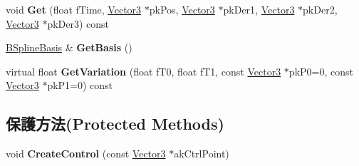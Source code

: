 \begin{DoxyCompactItemize}
\item 
void {\bfseries Get} (float f\+Time, \hyperlink{class_i_dream_sky_1_1_vector3}{Vector3} $\ast$pk\+Pos, \hyperlink{class_i_dream_sky_1_1_vector3}{Vector3} $\ast$pk\+Der1, \hyperlink{class_i_dream_sky_1_1_vector3}{Vector3} $\ast$pk\+Der2, \hyperlink{class_i_dream_sky_1_1_vector3}{Vector3} $\ast$pk\+Der3) const \hypertarget{class_i_dream_sky_1_1_b_spline_curve3_abe89d536ac7538ada15a1e2e958b33c0}{}\label{class_i_dream_sky_1_1_b_spline_curve3_abe89d536ac7538ada15a1e2e958b33c0}

\item 
\hyperlink{class_i_dream_sky_1_1_b_spline_basis}{B\+Spline\+Basis} \& {\bfseries Get\+Basis} ()\hypertarget{class_i_dream_sky_1_1_b_spline_curve3_af613d548e0dae2f367ec82d960076c2f}{}\label{class_i_dream_sky_1_1_b_spline_curve3_af613d548e0dae2f367ec82d960076c2f}

\item 
virtual float {\bfseries Get\+Variation} (float f\+T0, float f\+T1, const \hyperlink{class_i_dream_sky_1_1_vector3}{Vector3} $\ast$pk\+P0=0, const \hyperlink{class_i_dream_sky_1_1_vector3}{Vector3} $\ast$pk\+P1=0) const \hypertarget{class_i_dream_sky_1_1_b_spline_curve3_acf88c8f0eec87d82128b2c15555406cb}{}\label{class_i_dream_sky_1_1_b_spline_curve3_acf88c8f0eec87d82128b2c15555406cb}

\end{DoxyCompactItemize}
\subsection*{保護方法(Protected Methods)}
\begin{DoxyCompactItemize}
\item 
void {\bfseries Create\+Control} (const \hyperlink{class_i_dream_sky_1_1_vector3}{Vector3} $\ast$ak\+Ctrl\+Point)\hypertarget{class_i_dream_sky_1_1_b_spline_curve3_a5ec5c65244cf008c7e33f06520f6ba2b}{}\label{class_i_dream_sky_1_1_b_spline_curve3_a5ec5c65244cf008c7e33f06520f6ba2b}

\end{DoxyCompactItemize}
